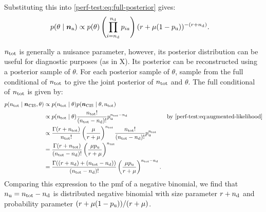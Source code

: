 \documentclass[thesis.tex]{subfiles}
\begin{document}
Substituting this into \cref{perf-test:eq:full-posterior} gives:
\begin{align}
p(\theta \mid \bm{n_\text{a}})
&\propto p(\theta) \left( \prod_{i=n_\text{d}}^{n_\text{d}} p_{ia} \right) (r + \mu (1- p_\text{u}))^{-(r+n_\text{d})} \label{perf-test:eq:full-posterior-simplified}.
\end{align}

$n_\text{tot}$ is generally a nuisance parameter, however, its posterior distribution can be useful for diagnostic purposes (as in X).
Its posterior can be reconstructed using a posterior sample of $\theta$.
For each posterior sample of $\theta$, sample from the full conditional of $n_\text{tot}$ to give the joint posterior of $n_\text{tot}$ and $\theta$.
The full conditional of $n_\text{tot}$ is given by:
\begin{align}
p(n_\text{tot} \mid \ncis, \theta)
&\propto p(\ntot \mid \theta) p(\ncis \mid \theta, \ntot) \\
&\propto p(\ntot \mid \theta) \frac{\ntot!}{(\ntot - \ndet)!} \pnodet^{\ntot - \ndet} &\text{by \cref{perf-test:eq:augmented-likelihood}} \\
&\propto \frac{\Gamma(r + \ntot)}{\ntot!} \left( \frac{\mu}{r + \mu} \right)^{\ntot} \frac{\ntot!}{(\ntot-\ndet)!} \pnodet^{\ntot} \\
&= \frac{\Gamma(r + \ntot)}{(\ntot-\ndet)!} \left( \frac{\mu \pnodet}{r + \mu} \right)^{\ntot}  \\
&= \frac{\Gamma((r + \ndet) + (\ntot- \ndet))}{(\ntot-\ndet)!} \left( \frac{\mu \pnodet}{r + \mu} \right)^{\ntot-\ndet}.
\end{align}
Comparing this expression to the pmf of a negative binomial, we find that $n_\text{u} = n_\text{tot} - n_\text{d}$ is distributed negative binomial with size parameter $r+n_\text{d}$ and probability parameter $(r + \mu(1 - p_\text{u}))/(r + \mu)$.
\end{document}
